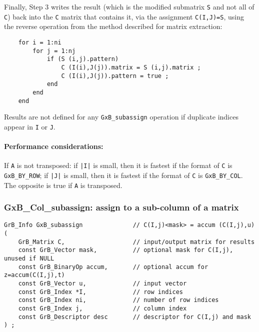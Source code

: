 \documentclass[12pt]{article}
\begin{document}
Finally, Step 3 writes the result (which is the modified submatrix \verb'S' and
not all of \verb'C') back into the \verb'C' matrix that contains it, via the
assignment \verb'C(I,J)=S', using the reverse operation from the method
described for matrix extraction:

    {\footnotesize
    \begin{verbatim}
    for i = 1:ni
        for j = 1:nj
            if (S (i,j).pattern)
                C (I(i),J(j)).matrix = S (i,j).matrix ;
                C (I(i),J(j)).pattern = true ;
            end
        end
    end \end{verbatim}}

Results are not defined for any \verb'GxB_subassign' operation if duplicate
indices appear in \verb'I' or \verb'J'.

\paragraph{\bf Performance considerations:} %
If \verb'A' is not transposed: if \verb'|I|' is small, then it is fastest if
the format of \verb'C' is \verb'GxB_BY_ROW'; if \verb'|J|' is small, then it is
fastest if the format of \verb'C' is \verb'GxB_BY_COL'.  The opposite is true
if \verb'A' is transposed.

\newpage
\subsubsection{{\sf GxB\_Col\_subassign:} assign to a sub-column of a matrix}
\label{subassign_column}

\begin{mdframed}[userdefinedwidth=6in]
{\footnotesize
\begin{verbatim}
GrB_Info GxB_subassign              // C(I,j)<mask> = accum (C(I,j),u)
(
    GrB_Matrix C,                   // input/output matrix for results
    const GrB_Vector mask,          // optional mask for C(I,j), unused if NULL
    const GrB_BinaryOp accum,       // optional accum for z=accum(C(I,j),t)
    const GrB_Vector u,             // input vector
    const GrB_Index *I,             // row indices
    const GrB_Index ni,             // number of row indices
    const GrB_Index j,              // column index
    const GrB_Descriptor desc       // descriptor for C(I,j) and mask
) ;
\end{verbatim} } \end{mdframed}
\end{document}
